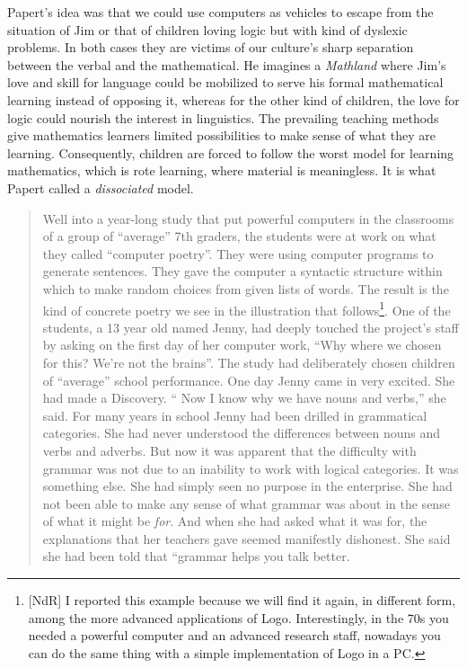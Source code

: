 Papert's idea was that we could use computers as vehicles to escape from the situation of Jim or that of children loving logic but with kind of dyslexic problems. In both cases they are victims of our culture's sharp separation between the verbal and the mathematical. He imagines a \textit{Mathland} where Jim's love and skill for language could be mobilized to serve his formal mathematical learning instead of opposing it, whereas for the other kind of children, the love for logic could nourish the interest in linguistics. The prevailing teaching methods give mathematics learners limited possibilities to make sense of what they are learning. Consequently, children are forced to follow the worst model for learning mathematics, which is rote learning, where material is meaningless. It is what Papert called a \textit{dissociated} model.

\begin{quote}
Well into a year-long study that put powerful computers in the classrooms of a group of “average” 7th graders, the students were at work on what they called “computer poetry”.  They were using computer programs to generate sentences. They gave the computer a syntactic structure within which to make random choices from given lists of words. The result is the kind of concrete poetry we see in the illustration that follows\footnote{[NdR] I reported this example because we will find it again, in different form, among the more advanced applications of Logo. Interestingly, in the 70s you needed a powerful computer and an advanced research staff, nowadays you can do the same thing with a simple implementation of Logo in a PC.}. One of the students, a 13 year old named Jenny, had deeply touched the project’s staff by asking on the first day of her computer work, “Why where we chosen for this? We’re not the brains”. The study had deliberately chosen children of “average” school performance. One day Jenny came in very excited. She had made a Discovery. “ Now I know why we have nouns and verbs,” she said.  For many years in school Jenny had been drilled in grammatical categories. She had never understood the differences between nouns and verbs and adverbs.  But now it was apparent that the difficulty with grammar was not due to an inability to work with logical categories. It was something else. She had simply seen no purpose in the enterprise. She had not been able to make any sense of what grammar was about in the sense of what it might be \textit{for}. And when she had asked what it was for, the explanations that her teachers gave seemed manifestly dishonest. She said she had been told that “grammar helps you talk better.
\end{quote}

